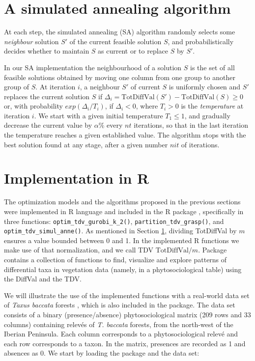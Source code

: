 \section{A simulated annealing algorithm}\label{SA}

At each step, the simulated annealing (SA) algorithm \citep{KGV1983, AKL1997} randomly selects some \emph{neighbour} solution \(S'\) of the current feasible solution \(S\), and probabilistically decides whether to maintain \(S\) as current or to replace \(S\) by \(S'\).

In our SA implementation the neighbourhood of a solution \(S\) is the set of all feasible solutions obtained by moving one column from one group to another group of \(S\).
At iteration \(i\), a neighbour \(S'\) of current \(S\) is uniformly chosen and \(S'\) replaces the current solution \(S\) if \(\Delta_i= \mathrm{TotDiffVal}(S')- \mathrm{TotDiffVal}(S)\geq 0\) or, with probability \(exp(\Delta_i/T_i)\), if \(\Delta_i<0\), where \(T_i>0\) is the \emph{temperature} at iteration \(i\). We start with a given initial temperature \(T_1\leq 1\), and gradually decrease the current value by \(\alpha\)\% every \(nt\) iterations, so that in the last iteration the temperature reaches a given established value. The algorithm stops with the best solution found at any stage, after a given number \(nit\) of iterations.

\section{Implementation in R}\label{implementation}

The optimization models and the algorithms proposed in the previous sections were implemented in R language and included in the R package , specifically in three functions: \texttt{optim\_tdv\_gurobi\_k\_2()}, \texttt{partition\_tdv\_grasp()}, and \texttt{optim\_tdv\_simul\_anne()}. As mentioned in Section \hyperref[intro]{1}, dividing TotDiffVal by \(m\) ensures a value bounded between 0 and 1. In the implemented R functions we make use of that normalization, and we call TDV \(\mathrm{TotDiffVal}/m\). Package  contains a collection of functions to find, visualize and explore patterns of differential taxa in vegetation data (namely, in a phytosociological table) using the DiffVal and the TDV.

We will illustrate the use of the implemented functions with a real-world data set of \emph{Taxus baccata} forests \citep[from][]{PEMCFGFN21}, which is also included in the package. The data set consists of a binary (presence/absence) phytosociological matrix (209 rows and 33 columns) containing relevés of \emph{T. baccata} forests, from the north-west of the Iberian Peninsula. Each column corresponds to a phytosociological relevé and each row corresponds to a taxon. In the matrix, presences are recorded as 1 and absences as 0. We start by loading the package and the data set:

